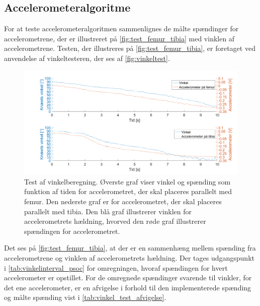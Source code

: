 \subsection{Accelerometeralgoritme}
For at teste accelerometeralgoritmen sammenlignes de målte spændinger for accelerometrene, der er illustreret på \autoref{fig:test_femur_tibia} med vinklen af accelerometrene.
Testen, der illustreres på \autoref{fig:test_femur_tibia}, er foretaget ved anvendelse af vinkeltesteren, der ses af \autoref{fig:vinkeltest}.  

\begin{figure}[H]
\centering
\includegraphics[width=1\textwidth]{figures/vinkel_tibia_femur}
\caption{Test af vinkelberegning. Øverste graf viser vinkel og spænding som funktion af tiden for accelerometret, der skal placeres parallelt med femur. Den nederste graf er for accelerometret, der skal placeres parallelt med tibia. Den blå graf illustrerer vinklen for accelerometrets hældning, hvorved den røde graf illustrerer spændingen for accelerometret.}
\label{fig:test_femur_tibia}
\end{figure}

\noindent
Det ses på \autoref{fig:test_femur_tibia}, at der er en sammenhæng mellem spænding fra accelerometrene og vinklen af accelerometrets hældning. 
Der tages udgangspunkt i \autoref{tab:vinkelinterval_psoc} for omregningen, hvoraf spændingen for hvert accelerometer er opstillet. For de omregnede spændinger svarende til vinkler, for det ene accelerometer, er en afvigelse i forhold til den implementerede spænding og målte spænding vist i \autoref{tab:vinkel_test_afvigelse}.

